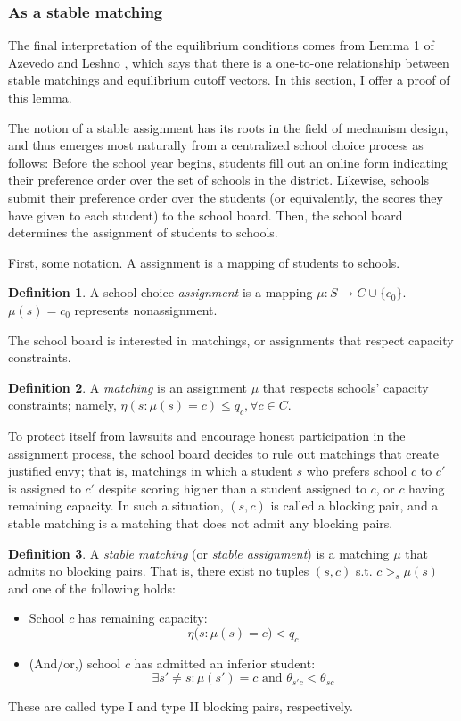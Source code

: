 \documentclass[12pt]{article}
\theoremstyle{definition}
\newtheorem{definition}{Definition}
\begin{document}
\subsubsection{As a stable matching}
The final interpretation of the equilibrium conditions comes from Lemma 1 of Azevedo and Leshno \parencite*{supplydemandfw}, which says that there is a one-to-one relationship between stable matchings and equilibrium cutoff vectors. In this section, I offer a proof of this lemma. 

The notion of a stable assignment has its roots in the field of mechanism design, and thus emerges most naturally from a centralized school choice process as follows: Before the school year begins, students fill out an online form indicating their preference order over the set of schools in the district. Likewise, schools submit their preference order over the students (or equivalently, the scores they have given to each student) to the school board. Then, the school board determines the assignment of students to schools. 

First, some notation. A assignment is a mapping of students to schools.
\begin{definition}
A school choice \emph{assignment} is a mapping $\mu: S \to C \cup \{c_0\}$. $\mu(s) = c_0$ represents nonassignment.
\end{definition}
The school board is interested in matchings, or assignments that respect capacity constraints. 
\begin{definition}
A \emph{matching} is an assignment $\mu$ that respects schools' capacity constraints; namely, $\eta (s: \mu(s) = c) \leq q_c, \forall c \in C$. 
\end{definition}
To protect itself from lawsuits and encourage honest participation in the assignment process, the school board decides to rule out matchings that create justified envy; that is, matchings in which a student $s$ who prefers school $c$ to $c'$ is assigned to $c'$ despite scoring higher than a student assigned to $c$, or $c$ having remaining capacity. In such a situation, $(s, c)$ is called a blocking pair, and a stable matching is a matching that does not admit any blocking pairs.
\begin{definition}
A \emph{stable matching} (or \emph{stable assignment}) is a matching $\mu$ that admits no blocking pairs. That is, there exist no tuples $(s, c)$ s.t. $c >_s \mu(s)$ and one of the following holds:
\begin{itemize}
\item School $c$ has remaining capacity:
\[\eta\bigl(s: \mu(s) = c \bigr) < q_c\]
\item (And/or,) school $c$ has admitted an inferior student:
\[\exists s' \neq s: \mu(s') = c \text{ and } \theta_{s'c} < \theta_{sc}\] 
\end{itemize}
These are called type I and type II blocking pairs, respectively.
\end{definition}
\end{document}
